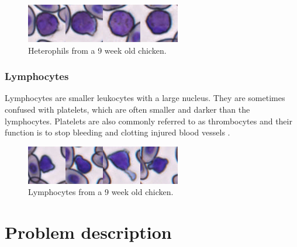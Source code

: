 \begin{figure}[h!]
    \centering
    \includegraphics{heterophils.png}
    \caption{Heterophils from a 9 week old chicken.}
    \label{fig:heterophil}
\end{figure}

\subsubsection{Lymphocytes}
Lymphocytes are smaller leukocytes with a large nucleus. They are sometimes confused with platelets, which are often smaller and darker than the lymphocytes. Platelets are also commonly referred to as thrombocytes and their function is to stop bleeding and clotting injured blood vessels \cite{NYAS:NYAS297}.
\begin{figure}[h!]
    \centering
    \includegraphics{lymphocytes.png}
    \caption{Lymphocytes from a 9 week old chicken.}
    \label{fig:heterophil}
\end{figure}

\section{Problem description}

